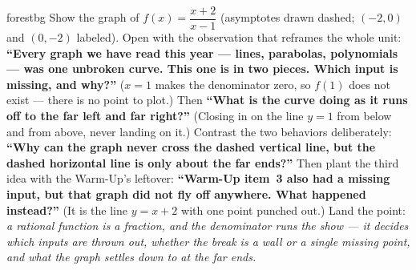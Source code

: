 \documentclass[10pt]{article}
\begin{document}
\begin{skillbox}[Hook]{forestbg}
    Show the graph of $f(x)=\dfrac{x+2}{x-1}$ (asymptotes drawn dashed; $(-2,0)$ and $(0,-2)$
    labeled). Open with the observation that reframes the whole unit: \textbf{``Every graph we have
    read this year --- lines, parabolas, polynomials --- was one unbroken curve. This one is in two
    pieces. Which input is missing, and why?''} ($x=1$ makes the denominator zero, so $f(1)$ does not
    exist --- there is no point to plot.) Then \textbf{``What is the curve doing as it runs off to the
    far left and far right?''} (Closing in on the line $y=1$ from below and from above, never landing
    on it.) Contrast the two behaviors deliberately: \textbf{``Why can the graph never cross the
    dashed vertical line, but the dashed horizontal line is only about the far ends?''} Then plant the
    third idea with the Warm-Up's leftover: \textbf{``Warm-Up item~3 also had a missing input, but
    that graph did not fly off anywhere. What happened instead?''} (It is the line $y=x+2$ with one
    point punched out.) Land the point: \emph{a rational function is a fraction, and the denominator
    runs the show --- it decides which inputs are thrown out, whether the break is a wall or a single
    missing point, and what the graph settles down to at the far ends.}
\end{skillbox}
\end{document}

